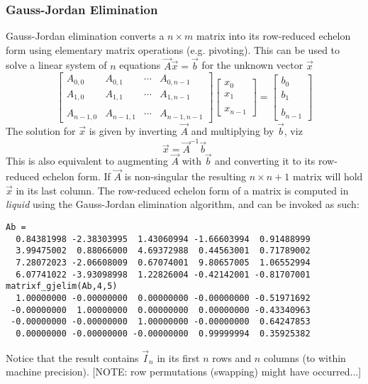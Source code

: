 \subsubsection{Gauss-Jordan Elimination}
Gauss-Jordan elimination converts a $n \times m$ matrix into its row-reduced
echelon form using elementary matrix operations (e.g. pivoting).
This can be used to solve a linear system of $n$ equations
$\vec{A}\vec{x} = \vec{b}$ for the unknown vector $\vec{x}$
\[
    \begin{bmatrix}
        A_{0,0}     & A_{0,1}   & \cdots  & A_{0,n-1} \\
        A_{1,0}     & A_{1,1}   & \cdots  & A_{1,n-1} \\
        \\
        A_{n-1,0}   & A_{n-1,1} & \cdots  & A_{n-1,n-1}
    \end{bmatrix}
    \begin{bmatrix}
        x_{0} \\
        x_{1} \\
        \\
        x_{n-1}
    \end{bmatrix}
    =
    \begin{bmatrix}
        b_{0} \\
        b_{1} \\
        \\
        b_{n-1}
    \end{bmatrix}
\]
The solution for $\vec{x}$ is given by inverting $\vec{A}$ and multiplying
by $\vec{b}$, viz
\[
    \vec{x} = \vec{A}^{-1}\vec{b}
\]
This is also equivalent to augmenting $\vec{A}$ with $\vec{b}$ and
converting it to its row-reduced echelon form.
If $\vec{A}$ is non-singular the resulting $n \times n+1$ matrix will hold
$\vec{x}$ in its last column.
The row-reduced echelon form of a matrix is computed in {\it liquid} using the
Gauss-Jordan elimination algorithm, and can be invoked as such:
\begin{verbatim}
Ab =
  0.84381998 -2.38303995  1.43060994 -1.66603994  0.91488999
  3.99475002  0.88066000  4.69372988  0.44563001  0.71789002
  7.28072023 -2.06608009  0.67074001  9.80657005  1.06552994
  6.07741022 -3.93098998  1.22826004 -0.42142001 -0.81707001
matrixf_gjelim(Ab,4,5)
  1.00000000 -0.00000000  0.00000000 -0.00000000 -0.51971692
 -0.00000000  1.00000000  0.00000000  0.00000000 -0.43340963
 -0.00000000 -0.00000000  1.00000000 -0.00000000  0.64247853
  0.00000000 -0.00000000 -0.00000000  0.99999994  0.35925382
\end{verbatim}
Notice that the result contains $\vec{I}_n$ in its first $n$ rows and $n$
columns (to within machine precision).
[NOTE: row permutations (swapping) might have occurred...]

